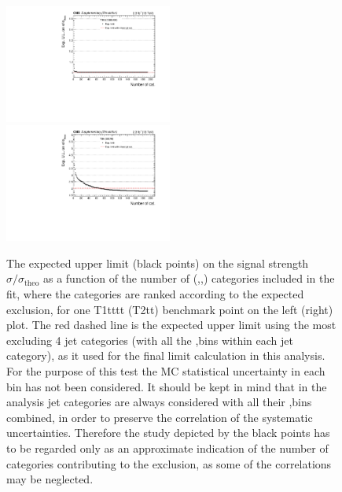 \clearpage
\begin{figure}[t]
  \begin{center}
    \includegraphics[width=0.49\textwidth]{supplementary/figures/expVsCat_SMS-T1tttt_mGluino-1300_mLSP-100_25ns} \, 
    \includegraphics[width=0.49\textwidth]{supplementary/figures/expVsCat_SMS-T2tt_mStop-250_mLSP-75_25ns} \,     
  \end{center}
  \caption{
  The expected upper limit (black points) on the signal strength $\sigma/\sigma_{\mathrm{theo}}$ as a function of the number of 
  (\nj,\nb,\scalht) categories included in the fit, where the categories are ranked according to the expected exclusion, 
  for one T1tttt (T2tt) benchmark point on the left (right) plot. 
  The red dashed line is the expected upper limit using the most excluding 4 jet categories (with all the \nb,\scalht bins within each jet category), 
  as it used for the final limit calculation in this analysis. 
  For the purpose of this test the MC statistical uncertainty in each bin has not been considered. 
  It should be kept in mind that in the analysis jet categories are always considered with all their \nb,\scalht bins 
  combined, in order to preserve the correlation of the systematic uncertainties. 
  Therefore the study depicted by the black points has to be regarded only as an approximate indication 
  of the number of categories contributing to the exclusion, as some of the correlations may be neglected.
  \label{fig:sensitivityVsCat}}
\end{figure}



